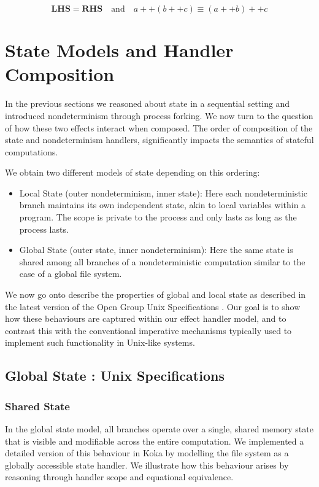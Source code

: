 \documentclass[logo,bsc,singlespacing,parskip]{infthesis}
\begin{document}
\[
\textbf{LHS} = \textbf{RHS} \quad \text{and} \quad a ++ (b ++ c) \equiv (a ++ b) ++ c
\]




\section{State Models and Handler Composition}
In the previous sections we reasoned about state in a  sequential setting and introduced nondeterminism through process forking. We now turn to the question of how these two effects interact when composed. The order of composition of the state and nondeterminism handlers, significantly impacts the semantics of stateful computations. 

We obtain two different models of state depending on this ordering:
\begin{itemize}
    \item Local State (outer nondeterminism, inner state): Here each nondeterministic branch maintains its own independent state, akin to local variables within a program. The scope is private to the process and only lasts as long as the process lasts.
    \item Global State (outer state, inner nondeterminism): Here the same state is shared among all branches of a nondeterministic computation similar to the case of a global file system.
\end{itemize}



We now go onto describe the properties of global and local state as described in the latest version of the Open Group Unix Specifications \cite{posix}. Our goal is to show how these behaviours are captured within our effect handler model, and to contrast this with the conventional imperative mechanisms typically used to implement such functionality in Unix-like systems.



\subsection{Global State : Unix Specifications}
\subsubsection*{Shared State} 
In the global state model, all branches operate over a single, shared memory state that is visible and modifiable across the entire computation. We implemented a detailed version of this behaviour in Koka by modelling the file system as a globally accessible state handler. We illustrate how this behaviour arises by reasoning through handler scope and equational equivalence.
\end{document}

